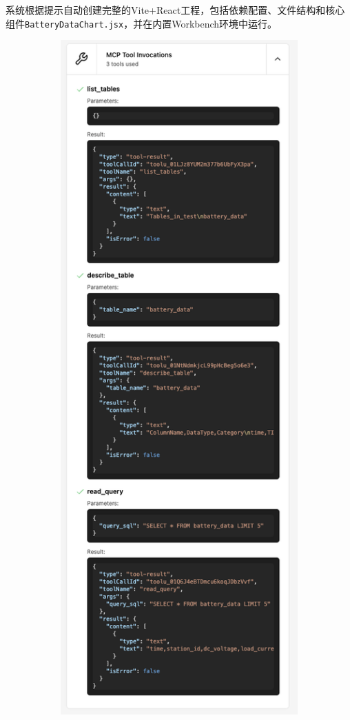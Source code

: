 系统根据提示自动创建完整的Vite+React工程，包括依赖配置、文件结构和核心组件\texttt{BatteryDataChart.jsx}，并在内置Workbench环境中运行。

\begin{figure}[H]
  \centering
  \begin{subfigure}{0.48\textwidth}
    \centering
    \includegraphics[width=\textwidth]{figures/screenshots/iotdb-demo/mcp-call.png}

\end{subfigure}
\end{figure}

